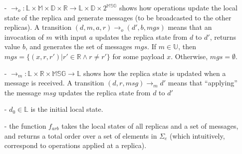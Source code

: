 \begin{itemize}
\setlength{\itemsep}{0.5pt}
\item[-] $\rightarrow_o: \mathbb{L} \times \mathbb{M} \times \mathbb{D} \times \mathbb{R} \rightarrow \mathbb{L} \times \mathbb{D} \times 2^{\mathbb{MSG}}$ shows how operations update the local state of the replica and generate messages (to be broadcasted to the other replicas). A transition $(d,m,a,r) \rightarrow_o (d',b,\mathit{mgs})$ means that an invocation of $m$ with input $a$ updates the replica state from $d$ to $d'$, returns value $b$, and generates the set of messages $\mathit{mgs}$.
If $m \in \mathbb{U}$, then $\mathit{mgs} = \{ (x,r,r') \vert r' \in \mathbb{R} \wedge r \neq r' \}$ for some payload $x$. Otherwise, $\mathit{mgs} = \emptyset$.

\item[-] $\rightarrow_m: \mathbb{L} \times \mathbb{R} \times \mathbb{MSG} \rightarrow \mathbb{L}$ shows how the replica state is updated when a message is received. A transition $(d,r,\mathit{msg}) \rightarrow_m d'$ means that ``applying'' the message $\mathit{msg}$ updates the replica state from $d$ to $d'$

\item[-] $d_0 \in \mathbb{L}$ is the initial local state.

\item[-] the function $f_{\mathit{arb}}$ takes the local states of all replicas and a set of messages, and returns a total order over a set of elements in $\Sigma_e$ (which intuitively, correspond to operations applied at a replica). %
%
%
%
\end{itemize}


